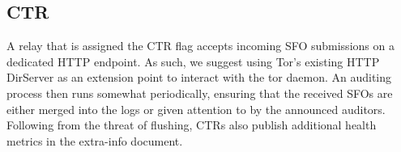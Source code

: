%
%

\subsection{CTR}
A relay that is assigned the CTR flag accepts incoming SFO submissions on a
dedicated HTTP endpoint.  As such, we suggest using Tor's existing HTTP
DirServer as an extension point to interact with the tor daemon.  An auditing
process then runs somewhat periodically, ensuring that the received SFOs are
either merged into the logs or given attention to by the announced auditors.
Following from the threat of flushing, CTRs also publish additional health
metrics in the extra-info document.


